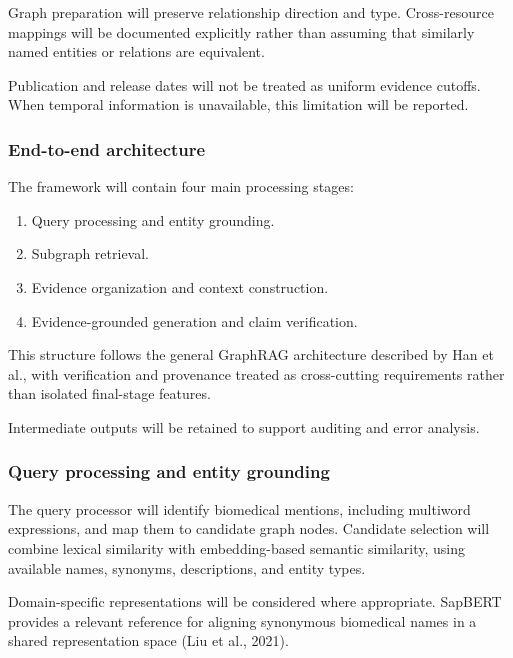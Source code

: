 Graph preparation will preserve relationship direction and type. Cross-resource mappings will be documented explicitly rather than assuming that similarly named entities or relations are equivalent.

Publication and release dates will not be treated as uniform evidence cutoffs. When temporal information is unavailable, this limitation will be reported.

\subsubsection{End-to-end architecture}\label{end-to-end-architecture}

The framework will contain four main processing stages:

\begin{enumerate}
\def\labelenumi{\arabic{enumi}.}
\tightlist
\item
  Query processing and entity grounding.
\item
  Subgraph retrieval.
\item
  Evidence organization and context construction.
\item
  Evidence-grounded generation and claim verification.
\end{enumerate}

This structure follows the general GraphRAG architecture described by Han et al., with verification and provenance treated as cross-cutting requirements rather than isolated final-stage features.

Intermediate outputs will be retained to support auditing and error analysis.

\subsubsection{Query processing and entity grounding}\label{query-processing-and-entity-grounding}

The query processor will identify biomedical mentions, including multiword expressions, and map them to candidate graph nodes. Candidate selection will combine lexical similarity with embedding-based semantic similarity, using available names, synonyms, descriptions, and entity types.

Domain-specific representations will be considered where appropriate. SapBERT provides a relevant reference for aligning synonymous biomedical names in a shared representation space (Liu et al., 2021).

